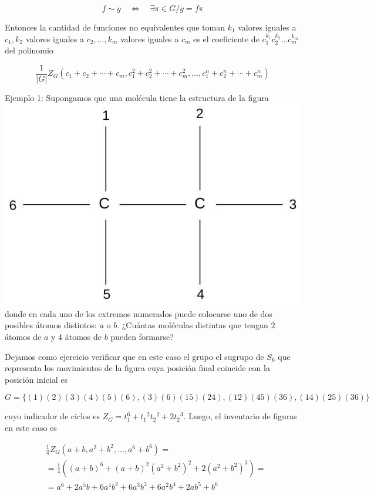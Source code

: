 \documentclass[10pt]{article}
\begin{document}
$$
f \sim g \quad \Longleftrightarrow \quad \exists \pi \in G / g=f \pi
$$

Entonces la cantidad de funciones no equivalentes que toman $k_{1}$ valores iguales a $c_{1}, k_{2}$ valores iguales a $c_{2}, \ldots, k_{m}$ valores iguales a $c_{m}$ es el coeficiente de $c_{1}^{k_{1}} c_{2}^{k_{2}} \ldots c_{m}^{k_{m}}$ del polinomio

$$
\frac{1}{|G|} Z_{G}\left(c_{1}+c_{2}+\cdots+c_{m}, c_{1}^{2}+c_{2}^{2}+\cdots+c_{m}^{2}, \ldots, c_{1}^{n}+c_{2}^{n}+\cdots+c_{m}^{n}\right)
$$

Ejemplo 1: Supongamos que una molécula tiene la estructura de la figura\\
\includegraphics[max width=\textwidth, center]{2025_09_05_3ba26226ec0baddb5a03g-61}\\
donde en cada uno de los extremos numerados puede colocarse uno de dos posibles átomos distintos: $a$ o $b$. ¿Cuántas moléculas distintas que tengan 2 átomos de $a$ y 4 átomos de $b$ pueden formarse?

Dejamos como ejercicio verificar que en este caso el grupo el sugrupo de $S_{6}$ que representa los movimientos de la figura cuya posición final coincide con la posición inicial es

$$
G=\{(1)(2)(3)(4)(5)(6),(3)(6)(15)(24),(12)(45)(36),(14)(25)(36)\}
$$

cuyo indicador de ciclos es $Z_{G}=t_{1}^{6}+t_{1}{ }^{2} t_{2}{ }^{2}+2 t_{2}{ }^{3}$. Luego, el inventario de figuras en este caso es

$$
\begin{aligned}
& \frac{1}{4} Z_{G}\left(a+b, a^{2}+b^{2}, \ldots, a^{6}+b^{6}\right)= \\
& =\frac{1}{4}\left((a+b)^{6}+(a+b)^{2}\left(a^{2}+b^{2}\right)^{2}+2\left(a^{2}+b^{2}\right)^{3}\right)= \\
& =a^{6}+2 a^{5} b+6 a^{4} b^{2}+6 a^{3} b^{3}+6 a^{2} b^{4}+2 a b^{5}+b^{6}
\end{aligned}
$$
\end{document}
